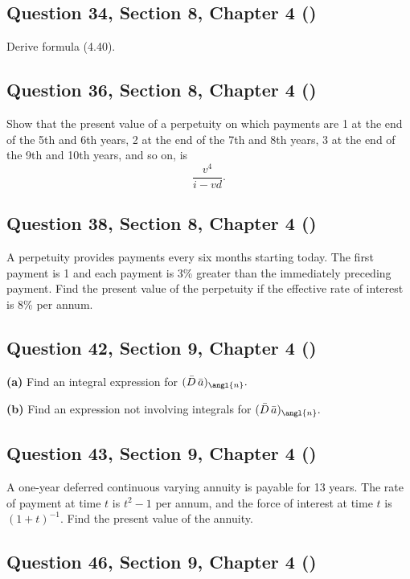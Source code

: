 \documentclass[12pt, a4paper]{article}
\begin{document}
\subsection*{Question 34, Section 8, Chapter 4  (\cite{toi3rd})}

\noindent Derive formula (4.40).

\subsection*{Question 36, Section 8, Chapter 4  (\cite{toi3rd})}

\noindent Show that the present value of a perpetuity on which payments are 1 at the end of the 5th and 6th years, 2 at the end of the 7th and 8th years,  
3 at the end of the 9th and 10th years, and so on, is 
\[
\frac{v^4}{i - v d}.
\]

\subsection*{Question 38, Section 8, Chapter 4  (\cite{toi3rd})}

\noindent A perpetuity provides payments every six months starting today. The first payment is 1 and each payment is 3\% greater than the immediately preceding payment. Find the present value of the perpetuity if the effective rate of interest is 8\% per annum.

\subsection*{Question 42, Section 9, Chapter 4  (\cite{toi3rd})}

\textbf{(a)} Find an integral expression for \( (\bar{D} \, \bar{a})_{\angl{n}}. \)

\textbf{(b)} Find an expression not involving integrals for \( (\bar{D} \, \bar{a})_{\angl{n}}. \)

\subsection*{Question 43, Section 9, Chapter 4  (\cite{toi3rd})}

\noindent A one-year deferred continuous varying annuity is payable for 13 years. The rate of payment at time \( t \) is \( t^2 - 1 \) per annum, and the force of interest at time \( t \) is \( (1 + t)^{-1} \). Find the present value of the annuity.

\subsection*{Question 46, Section 9, Chapter 4  (\cite{toi3rd})}
\end{document}
